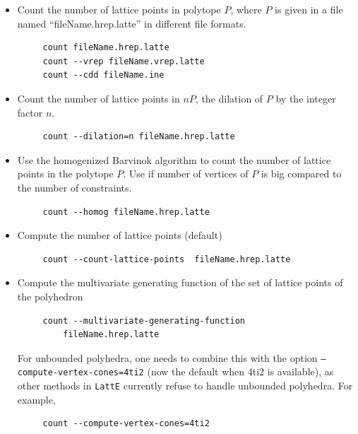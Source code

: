 \documentclass{article}
\newcommand{\latte}{{\tt LattE}\xspace}
\begin{document}
\begin{itemize}
\item Count the number of lattice points in polytope $P$, where $P$  is given in a file named ``fileName.hrep.latte'' in different file formats.
        \begin{verbatim}
     count fileName.hrep.latte
     count --vrep fileName.vrep.latte
     count --cdd fileName.ine
        \end{verbatim} 

\item Count the number of lattice points in $nP$, the dilation of $P$ by the integer factor $n$.
        \begin{verbatim}
     count --dilation=n fileName.hrep.latte
        \end{verbatim} 

\item Use the homogenized Barvinok algorithm \cite{latte3} to count  the number of lattice points in the polytope $P$. Use if number of vertices of $P$ is big compared to the number of constraints. 
        \begin{verbatim}
     count --homog fileName.hrep.latte
        \end{verbatim} 
\item Compute the number of lattice points (default)
        \begin{verbatim}
     count --count-lattice-points  fileName.hrep.latte
        \end{verbatim} 
\item Compute the multivariate generating function of the set of lattice points of the polyhedron
        \begin{verbatim}
     count --multivariate-generating-function  
         fileName.hrep.latte
        \end{verbatim} 
For unbounded polyhedra, one needs to combine
  this with the option {\tt --compute-vertex-cones=4ti2} (now the default when
  4ti2 is available), as other methods in \latte currently refuse to handle
  unbounded polyhedra. For example,  
        \begin{verbatim}
     count --compute-vertex-cones=4ti2 

\end{verbatim}
\end{itemize}
\end{document}
